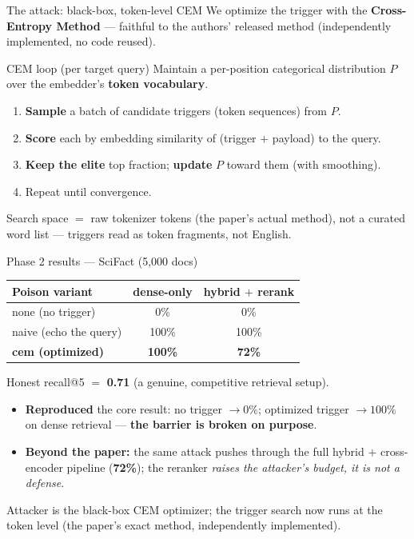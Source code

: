 \documentclass[aspectratio=169,11pt]{beamer}
\newcommand{\good}[1]{\textcolor{rbgreen}{\textbf{#1}}}
\newcommand{\bad}[1]{\textcolor{rbaccent}{\textbf{#1}}}
\begin{document}
\begin{frame}{The attack: black-box, token-level CEM}
  \small
  We optimize the trigger with the \textbf{Cross-Entropy Method} --- faithful to the authors' released method (independently implemented, no code reused).
  \begin{block}{CEM loop (per target query)}
    \scriptsize
    Maintain a per-position categorical distribution $P$ over the embedder's \textbf{token vocabulary}.
    \begin{enumerate}
      \item \textbf{Sample} a batch of candidate triggers (token sequences) from $P$.
      \item \textbf{Score} each by embedding similarity of (trigger $+$ payload) to the query.
      \item \textbf{Keep the elite} top fraction; \textbf{update} $P$ toward them (with smoothing).
      \item Repeat until convergence.
    \end{enumerate}
  \end{block}
  \vspace{-0.2em}
  \footnotesize Search space $=$ raw tokenizer tokens (the paper's actual method), not a curated word list --- triggers read as token fragments, not English.
\end{frame}

\begin{frame}{Phase 2 results --- SciFact (5{,}000 docs)}
  \small
  \begin{center}
  \begin{tabular}{lcc}
    \toprule
    \textbf{Poison variant} & \textbf{dense-only} & \textbf{hybrid $+$ rerank}\\
    \midrule
    none (no trigger)      & 0\%   & 0\% \\
    naive (echo the query) & 100\% & 100\% \\
    \textbf{cem (optimized)} & \bad{100\%} & \bad{72\%} \\
    \bottomrule
  \end{tabular}
  \end{center}
  \vspace{0.3em}
  Honest recall@5 $=$ \textbf{0.71} (a genuine, competitive retrieval setup).
  \begin{itemize}\small
    \item \good{Reproduced} the core result: no trigger $\to 0\%$; optimized trigger $\to 100\%$ on dense retrieval --- \textbf{the barrier is broken on purpose}.
    \item \textbf{Beyond the paper:} the same attack pushes through the full hybrid $+$ cross-encoder pipeline (\bad{72\%}); the reranker \emph{raises the attacker's budget, it is not a defense}.
  \end{itemize}
  \footnotesize\textcolor{rbgray}{Attacker is the black-box CEM optimizer; the trigger search now runs at the token level (the paper's exact method, independently implemented).}
\end{frame}
\end{document}
